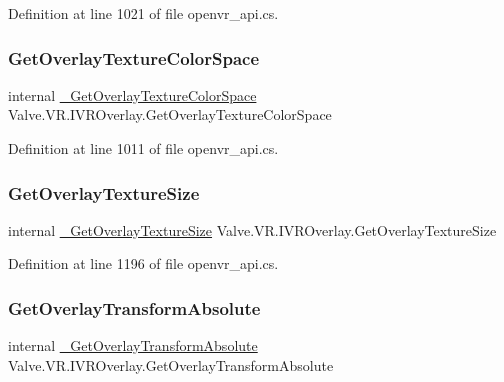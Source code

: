 Definition at line 1021 of file openvr\+\_\+api.\+cs.

\mbox{\label{struct_valve_1_1_v_r_1_1_i_v_r_overlay_a5c10d74dfee0c52a2ef094fcef46e77f}} 
\subsubsection{\texorpdfstring{GetOverlayTextureColorSpace}{GetOverlayTextureColorSpace}}
{\footnotesize\ttfamily internal \mbox{\hyperlink{struct_valve_1_1_v_r_1_1_i_v_r_overlay_a1622c8b6098d1b37a9a8f2a1b961f1cf}{\+\_\+\+Get\+Overlay\+Texture\+Color\+Space}} Valve.\+V\+R.\+I\+V\+R\+Overlay.\+Get\+Overlay\+Texture\+Color\+Space}



Definition at line 1011 of file openvr\+\_\+api.\+cs.

\mbox{\label{struct_valve_1_1_v_r_1_1_i_v_r_overlay_a642e14aa65ac3e802a3f9af985d089d7}} 
\subsubsection{\texorpdfstring{GetOverlayTextureSize}{GetOverlayTextureSize}}
{\footnotesize\ttfamily internal \mbox{\hyperlink{struct_valve_1_1_v_r_1_1_i_v_r_overlay_af3140dc6e2be438f6c5989c7e49f5408}{\+\_\+\+Get\+Overlay\+Texture\+Size}} Valve.\+V\+R.\+I\+V\+R\+Overlay.\+Get\+Overlay\+Texture\+Size}



Definition at line 1196 of file openvr\+\_\+api.\+cs.

\mbox{\label{struct_valve_1_1_v_r_1_1_i_v_r_overlay_a6bd8970d11bfbfd905fc4a87f2bb458a}} 
\subsubsection{\texorpdfstring{GetOverlayTransformAbsolute}{GetOverlayTransformAbsolute}}
{\footnotesize\ttfamily internal \mbox{\hyperlink{struct_valve_1_1_v_r_1_1_i_v_r_overlay_a1a1ee40ba7c9c9826b3646ded3df209f}{\+\_\+\+Get\+Overlay\+Transform\+Absolute}} Valve.\+V\+R.\+I\+V\+R\+Overlay.\+Get\+Overlay\+Transform\+Absolute}



